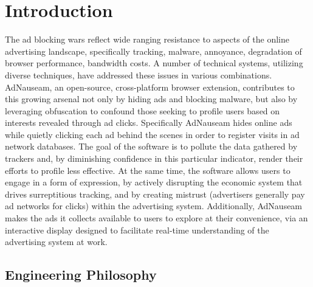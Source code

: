 \documentclass[conference]{IEEEtran}
\begin{document}

\section{Introduction}

The ad blocking wars \cite{Nytimes} reflect wide ranging resistance to aspects of the online advertising landscape, specifically tracking, malware, annoyance, degradation of browser performance, bandwidth costs. A number of technical systems, utilizing diverse techniques, have addressed these issues in various combinations. AdNauseam, an open-source, cross-platform browser extension, contributes to this growing arsenal not only by hiding ads and blocking malware, but also by leveraging obfuscation to confound those seeking to profile users based on interests revealed through ad clicks. Specifically AdNauseam hides online ads while quietly clicking each ad behind the scenes in order to register visits in ad network databases. The goal of the software is to pollute the data gathered by trackers and, by diminishing confidence in this particular indicator, render their efforts to profile less effective. At the same time, the software allows users to engage in a form of expression, by actively disrupting the economic system that drives surreptitious tracking, and by creating mistrust (advertisers generally pay ad networks for clicks) within the advertising system. Additionally, AdNauseam makes the ads it collects available to users to explore at their convenience, via an interactive display designed to facilitate real-time understanding of the advertising system at work.


\subsection{Engineering Philosophy}
\end{document}
